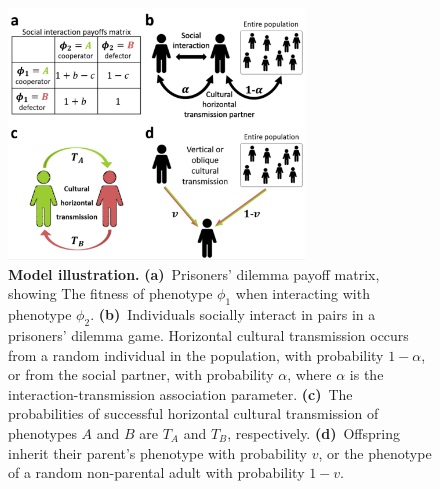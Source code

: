 \documentclass[12pt]{extarticle}
\begin{document}
\begin{figure}[pt]
  \centering
  \includegraphics[width=0.7\textwidth]{Illustration.pdf}
  \caption{\textbf{Model illustration.} 
  \textbf{(a)}~Prisoners' dilemma payoff matrix, showing The fitness of phenotype $\phi_1$ when interacting with phenotype $\phi_2$.
  \textbf{(b)}~Individuals socially interact in pairs in a prisoners' dilemma game. Horizontal cultural transmission occurs from a random individual in the population, with probability $1-\alpha$, or from the social partner, with probability $\alpha$, where $\alpha$ is the interaction-transmission association parameter.
  \textbf{(c)}~The probabilities of successful horizontal  cultural transmission of phenotypes $A$ and $B$ are $T_A$ and $T_B$, respectively.
  \textbf{(d)}~Offspring inherit their parent's phenotype with probability $v$, or the phenotype of a random non-parental adult with probability $1-v$.
    }
  \label{fig:illustration}
\end{figure}
\end{document}
